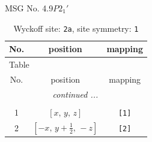 \documentclass[fleqn,8pt]{jsarticle}
\begin{document}
\setcounter{MaxMatrixCols}{32}

\renewcommand{\tablename}{Table~}
\renewcommand{\figurename}{Figure~}
\begin{center}
\LARGE
MSG No. 4.9\quad$P2_{1}'$
\end{center}
\renewcommand{\arraystretch}{1.2}
\begin{longtable}{ccc}
\caption{Wyckoff site: {\tt 2a}, site symmetry: {\tt 1}}
 \\
 \hline \hline
No. & position & mapping \\ \hline \endfirsthead

\multicolumn{2}{l}{\tablename\ \thetable{}} \\
 \hline \hline
No. & position & mapping \\ \hline \endhead

 \hline \hline
\multicolumn{2}{r}{\footnotesize\it continued ...} \\ \endfoot

 \hline \hline
\multicolumn{2}{r}{} \\ \endlastfoot

1 & $\left[ x,\, y,\, z \right]$ & {\tt [1]} \\ \hline
2 & $\left[ - x,\, y + \frac{1}{2},\, - z \right]$ & {\tt [2]} \\
\end{longtable}
\end{document}
